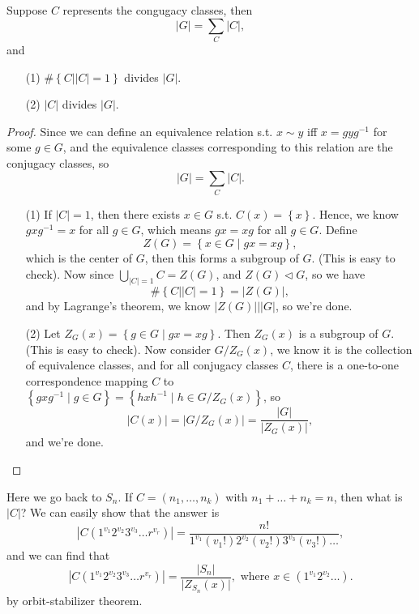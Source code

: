 \begin{theorem}
    Suppose \(C\) represents the congugacy classes, then 
    \[
        \vert G \vert = \sum_{C} \vert C \vert,   
    \] and 
    \begin{itemize}
        \item [(1)] \(\# \left\{ C \mid \vert C \vert = 1  \right\} \) divides \(\vert G \vert \). 
        \item [(2)] \(\vert C \vert \) divides \(\vert G \vert \).    
    \end{itemize}
\end{theorem}
\begin{proof}
    Since we can define an equivalence relation s.t. \(x \sim y\) iff \(x = g y g^{-1}\) for some \(g \in G\), and the equivalence classes corresponding to this relation are the conjugacy classes, so 
    \[
        \left\vert G \right\vert = \sum_{C} \vert C \vert.   
    \] 
    \begin{itemize}
        \item [(1)] If \(\vert C \vert = 1\), then there exists \(x \in G\) s.t. \(C(x) = \left\{ x \right\} \). Hence, we know \(g x g^{-1} = x\) for all \(g \in G\), which means \(gx = xg\) for all \(g \in G\). Define 
        \[
            Z(G) = \left\{ x \in G \mid gx = xg \right\}, 
        \] which is the center of \(G\), then this forms a subgroup of \(G\). (This is easy to check). Now since \(\bigcup_{\vert C \vert = 1 } C = Z(G) \), and \(Z(G) \triangleleft G \), so we have
        \[
            \# \left\{ C \mid \vert C \vert = 1  \right\} = \vert Z(G) \vert,  
        \] and by Lagrange's theorem, we know \(\vert Z(G) \vert \mid \vert G \vert  \), so we're done. 
        \item [(2)] Let \(Z_G(x) = \left\{ g \in G \mid gx = xg \right\} \). Then \(Z_G(x) \) is a subgroup of \(G\). (This is easy to check). Now consider \(G / Z_G(x)\), we know it is the collection of equivalence classes, and for all conjugacy classes \(C\), there is a one-to-one correspondence mapping \(C\) to \(\left\{ gxg^{-1} \mid g \in G \right\} = \left\{ h x h^{-1} \mid h \in G / Z_G(x) \right\} \), so 
        \[
            \vert C(x) \vert = \vert G / Z_G(x) \vert = \frac{\vert G \vert }{\vert Z_G(x) \vert },  
        \] and we're done.
    \end{itemize}
\end{proof}

Here we go back to \(S_n\). If \(C = (n_1, \dots , n_k)\) with \(n_1 + \dots + n_k = n\), then what is \(\vert C \vert \)? We can easily show that the answer is 
\[
    \left\vert C \left( 1^{v_1} 2^{v_2} 3^{v_3} \dots r^{v_r} \right)  \right\vert = \frac{n!}{1^{v_1} (v_1 !) 2^{v_2} (v_2 !) 3^{v_3} (v_3!) \dots }, 
\] and we can find that 
\[
   \left\vert C \left( 1^{v_1} 2^{v_2} 3^{v_3} \dots r^{v_r} \right) \right\vert = \frac{\vert S_n \vert }{\vert Z_{S_n}(x) \vert }, \text{ where } x \in \left( 1^{v_1} 2^{v_2} \dots  \right).  
\] by orbit-stabilizer theorem.